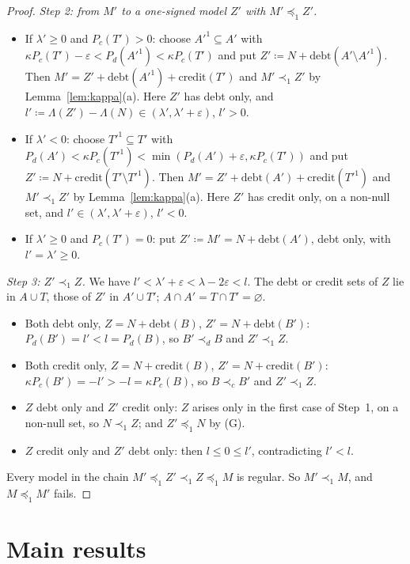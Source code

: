 \documentclass[11pt]{article}
\theoremstyle{definition}\newtheorem{definition}[theorem]{Definition}
\theoremstyle{remark}\newtheorem{remark}[theorem]{Remark}
\newcommand{\debt}{\mathrm{debt}}
\newcommand{\cred}{\mathrm{credit}}
\begin{document}
\begin{proof}
\emph{Step 2: from $M'$ to a one-signed model $Z'$ with $M'\preceq_1Z'$.}
\begin{itemize}[leftmargin=*,itemsep=1pt]
\item If $\lambda'\ge0$ and $P_c(T')>0$: choose $A'^1\subseteq A'$ with
$\kappa P_c(T')-\varepsilon<P_d(A'^1)<\kappa P_c(T')$ and put
$Z'\coloneqq N+\debt(A'\setminus A'^1)$. Then $M'=Z'+\debt(A'^1)+\cred(T')$
and $M'\prec_1Z'$ by Lemma~\ref{lem:kappa}(a). Here $Z'$ has debt only, and
$l'\coloneqq\Lambda(Z')-\Lambda(N)\in(\lambda',\lambda'+\varepsilon)$,
$l'>0$.
\item If $\lambda'<0$: choose $T'^1\subseteq T'$ with
$P_d(A')<\kappa P_c(T'^1)<\min(P_d(A')+\varepsilon,\kappa P_c(T'))$ and put
$Z'\coloneqq N+\cred(T'\setminus T'^1)$. Then $M'=Z'+\debt(A')+\cred(T'^1)$
and $M'\prec_1Z'$ by Lemma~\ref{lem:kappa}(a). Here $Z'$ has credit only, on
a non-null set, and $l'\in(\lambda',\lambda'+\varepsilon)$, $l'<0$.
\item If $\lambda'\ge0$ and $P_c(T')=0$: put $Z'\coloneqq M'=N+\debt(A')$,
debt only, with $l'=\lambda'\ge0$.
\end{itemize}

\emph{Step 3: $Z'\prec_1Z$.} We have $l'<\lambda'+\varepsilon<\lambda-
2\varepsilon<l$. The debt or credit sets of $Z$ lie in $A\cup T$, those of
$Z'$ in $A'\cup T'$; $A\cap A'=T\cap T'=\varnothing$.
\begin{itemize}[leftmargin=*,itemsep=1pt]
\item Both debt only, $Z=N+\debt(B)$, $Z'=N+\debt(B')$: $P_d(B')=l'<l=
P_d(B)$, so $B'\prec_dB$ and $Z'\prec_1Z$.
\item Both credit only, $Z=N+\cred(B)$, $Z'=N+\cred(B')$:
$\kappa P_c(B')=-l'>-l=\kappa P_c(B)$, so $B\prec_cB'$ and $Z'\prec_1Z$.
\item $Z$ debt only and $Z'$ credit only: $Z$ arises only in the first case
of Step~1, on a non-null set, so $N\prec_1Z$; and $Z'\preceq_1N$ by (G).
\item $Z$ credit only and $Z'$ debt only: then $l\le0\le l'$, contradicting
$l'<l$.
\end{itemize}
Every model in the chain $M'\preceq_1Z'\prec_1Z\preceq_1M$ is regular. So
$M'\prec_1M$, and $M\preceq_1M'$ fails.
\end{proof}

\section{Main results}\label{sec:main}
\end{document}
